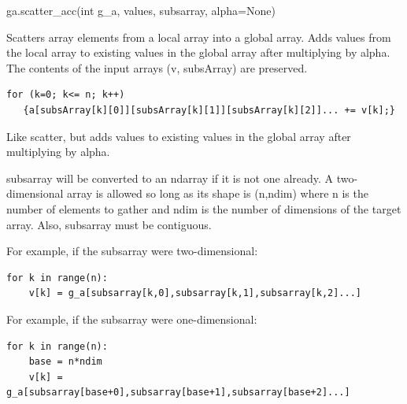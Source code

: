 \documentclass[12pt]{article}
\begin{document}
\begin{pyapi}
\begin{pycode}
ga.scatter_acc(int g_a, values, subsarray, alpha=None)
\end{pycode}
\begin{funcargs}
\end{funcargs}
\end{pyapi}

\ncoll

\begin{desc}

Scatters array elements from a local array into a global array. Adds values
from the local array to existing values in the global array after multiplying
by alpha. The contents of the input arrays (v, subsArray) are preserved.

\begin{verbatim}
for (k=0; k<= n; k++)
   {a[subsArray[k][0]][subsArray[k][1]][subsArray[k][2]]... += v[k];}
\end{verbatim}

Like scatter, but adds values to existing values in the global array after
multiplying by alpha.

\end{desc}

\begin{pydesc}

subsarray will be converted to an ndarray if it is not one already. A
two-dimensional array is allowed so long as its shape is (n,ndim) where n is
the number of elements to gather and ndim is the number of dimensions of the
target array. Also, subsarray must be contiguous.

For example, if the subsarray were two-dimensional:

\begin{verbatim}
for k in range(n):
    v[k] = g_a[subsarray[k,0],subsarray[k,1],subsarray[k,2]...]
\end{verbatim}

For example, if the subsarray were one-dimensional:

\begin{verbatim}
for k in range(n):
    base = n*ndim
    v[k] = g_a[subsarray[base+0],subsarray[base+1],subsarray[base+2]...]
\end{verbatim}

\end{pydesc}
\end{document}
